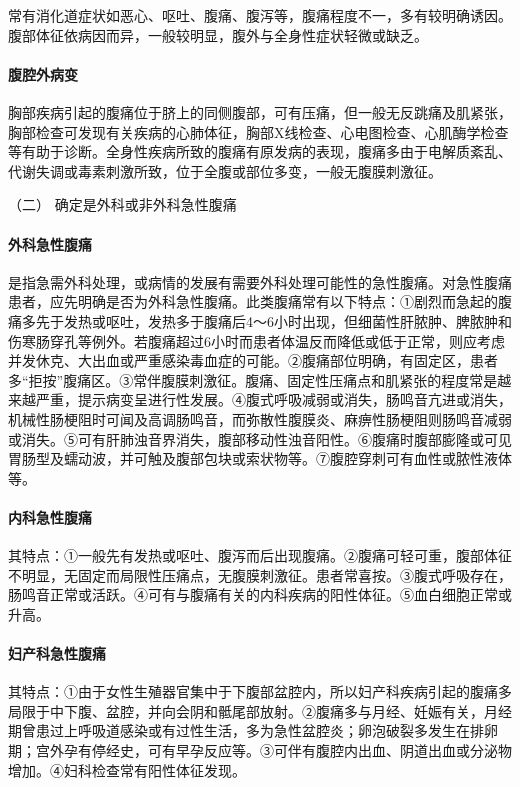 常有消化道症状如恶心、呕吐、腹痛、腹泻等，腹痛程度不一，多有较明确诱因。腹部体征依病因而异，一般较明显，腹外与全身性症状轻微或缺乏。

\paragraph{腹腔外病变}

胸部疾病引起的腹痛位于脐上的同侧腹部，可有压痛，但一般无反跳痛及肌紧张，胸部检查可发现有关疾病的心肺体征，胸部X线检查、心电图检查、心肌酶学检查等有助于诊断。全身性疾病所致的腹痛有原发病的表现，腹痛多由于电解质紊乱、代谢失调或毒素刺激所致，位于全腹或部位多变，一般无腹膜刺激征。

\hypertarget{text00026.htmlux5cux23CHP1-10-2-3-2}{}
（二） 确定是外科或非外科急性腹痛

\paragraph{外科急性腹痛}

是指急需外科处理，或病情的发展有需要外科处理可能性的急性腹痛。对急性腹痛患者，应先明确是否为外科急性腹痛。此类腹痛常有以下特点：①剧烈而急起的腹痛多先于发热或呕吐，发热多于腹痛后4～6小时出现，但细菌性肝脓肿、脾脓肿和伤寒肠穿孔等例外。若腹痛超过6小时而患者体温反而降低或低于正常，则应考虑并发休克、大出血或严重感染毒血症的可能。②腹痛部位明确，有固定区，患者多“拒按”腹痛区。③常伴腹膜刺激征。腹痛、固定性压痛点和肌紧张的程度常是越来越严重，提示病变呈进行性发展。④腹式呼吸减弱或消失，肠鸣音亢进或消失，机械性肠梗阻时可闻及高调肠鸣音，而弥散性腹膜炎、麻痹性肠梗阻则肠鸣音减弱或消失。⑤可有肝肺浊音界消失，腹部移动性浊音阳性。⑥腹痛时腹部膨隆或可见胃肠型及蠕动波，并可触及腹部包块或索状物等。⑦腹腔穿刺可有血性或脓性液体等。

\paragraph{内科急性腹痛}

其特点：①一般先有发热或呕吐、腹泻而后出现腹痛。②腹痛可轻可重，腹部体征不明显，无固定而局限性压痛点，无腹膜刺激征。患者常喜按。③腹式呼吸存在，肠鸣音正常或活跃。④可有与腹痛有关的内科疾病的阳性体征。⑤血白细胞正常或升高。

\paragraph{妇产科急性腹痛}

其特点：①由于女性生殖器官集中于下腹部盆腔内，所以妇产科疾病引起的腹痛多局限于中下腹、盆腔，并向会阴和骶尾部放射。②腹痛多与月经、妊娠有关，月经期曾患过上呼吸道感染或有过性生活，多为急性盆腔炎；卵泡破裂多发生在排卵期；宫外孕有停经史，可有早孕反应等。③可伴有腹腔内出血、阴道出血或分泌物增加。④妇科检查常有阳性体征发现。

